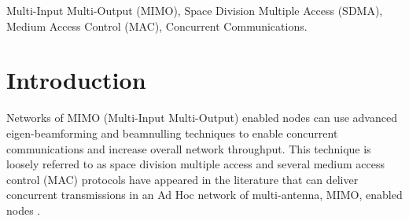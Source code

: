 \documentclass[journal, final]{IEEEtran}
\begin{document}
\begin{IEEEkeywords}
Multi-Input Multi-Output (MIMO), Space Division Multiple Access (SDMA), Medium Access Control (MAC), Concurrent Communications.
\end{IEEEkeywords}






\IEEEpeerreviewmaketitle



\section{Introduction}

Networks of MIMO (Multi-Input Multi-Output) enabled nodes can use advanced eigen-beamforming and
beamnulling techniques to enable concurrent communications and increase
overall network throughput. This technique is loosely
referred to as space division multiple access and several medium
access control (MAC) protocols have appeared in the literature that can
deliver concurrent transmissions in an Ad Hoc network of multi-antenna, MIMO,
enabled nodes \cite{1_SPACEMAC, 2_MIMOMAN, 3_NULLHOC, 4_nullhoc, 5_MIMA_MAC}.
\end{document}
